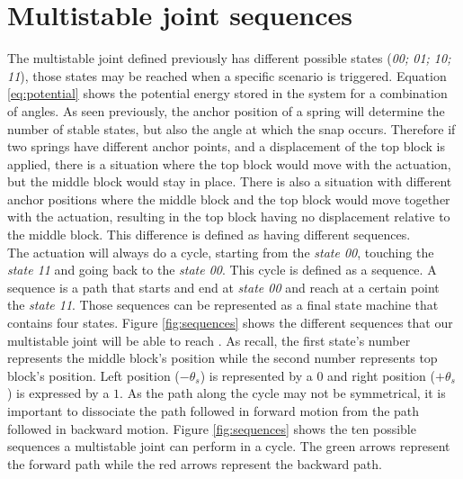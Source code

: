     \section{Multistable joint sequences}\label{sec:sequences}
        The multistable joint defined previously has different possible states (\textit{00; 01; 10; 11}), those states may be reached when a specific scenario is triggered. Equation \ref{eq:potential} shows the potential energy stored in the system for a combination of angles. As seen previously, the anchor position of a spring will determine the number of stable states, but also the angle at which the snap occurs. Therefore if two springs have different anchor points, and a displacement of the top block is applied, there is a situation where the top block would move with the actuation, but the middle block would stay in place. There is also a situation with different anchor positions where the middle block and the top block would move together with the actuation, resulting in the top block having no displacement relative to the middle block. This difference is defined as having different sequences.\\
        The actuation will always do a cycle, starting from the \textit{state 00}, touching the \textit{state 11} and going back to the \textit{state 00}. This cycle is defined as a sequence. A sequence is a path that starts and end at \textit{state 00} and reach at a certain point the \textit{state 11}. Those sequences can be represented as a final state machine that contains four states. Figure \ref{fig:sequences} shows the different sequences that our multistable joint will be able to reach \cite{mo_main_paper}. As recall, the first state's number represents the middle block's position while the second number represents top block's position. Left position ($-\theta_s$) is represented by a $0$ and right position ($+\theta_s$) is expressed by a $1$. As the path along the cycle may not be symmetrical, it is important to dissociate the path followed in forward motion from the path followed in backward motion. Figure \ref{fig:sequences} shows the ten possible sequences a multistable joint can perform in a cycle. The green arrows represent the forward path while the red arrows represent the backward path. \\
        
